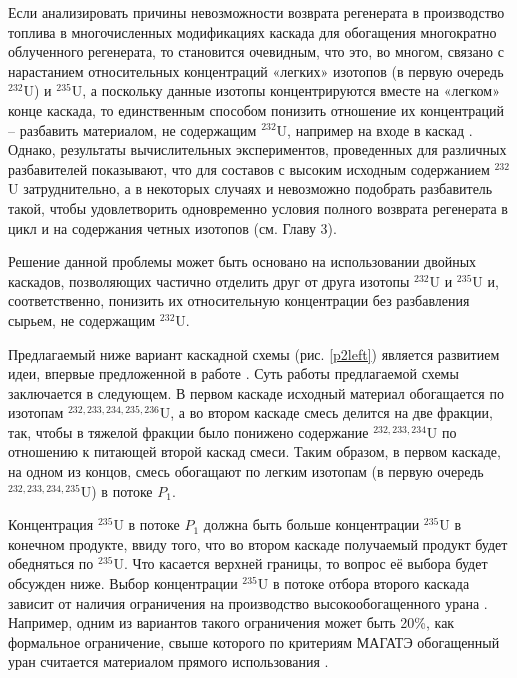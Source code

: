 Если анализировать причины невозможности возврата регенерата в производство топлива в многочисленных модификациях каскада для обогащения многократно облученного регенерата, то становится очевидным, что это, во многом, связано с нарастанием относительных концентраций «легких» изотопов (в первую очередь $^{232}$U) и $^{235}$U, а поскольку данные изотопы концентрируются вместе на «легком» конце каскада, то единственным способом понизить отношение их концентраций – разбавить материалом, не содержащим $^{232}$U, например на входе в каскад \cite{smirnovKaskadnyeShemyZadachah2012}. Однако, результаты вычислительных экспериментов, проведенных для различных разбавителей показывают, что для составов с высоким исходным содержанием $^{232}$U затруднительно, а в некоторых случаях и невозможно подобрать разбавитель такой, чтобы удовлетворить одновременно условия полного возврата регенерата в цикл и на содержания четных изотопов (см. Главу 3). 

Решение данной проблемы может быть основано на использовании двойных каскадов, позволяющих частично отделить друг от друга изотопы $^{232}$U и $^{235}$U и, соответственно, понизить их относительную концентрации без разбавления сырьем, не содержащим $^{232}$U. 

Предлагаемый ниже вариант каскадной схемы (рис. \ref{p2left}) является развитием идеи, впервые предложенной в работе \cite{vodolazskihSposobIzotopnogoVosstanovleniya2006}. Суть работы предлагаемой схемы заключается в следующем. В первом каскаде исходный материал обогащается по изотопам $^{232,233,234,235,236}$U, а во втором каскаде смесь делится на две фракции, так, чтобы в тяжелой фракции было понижено содержание $^{232,233,234}$U по отношению к питающей второй каскад смеси. Таким образом, в первом каскаде, на одном из концов, смесь обогащают по легким изотопам (в первую очередь $^{232,233,234,235}$U) в потоке $P_1$.

Концентрация $^{235}$U в потоке $P_1$ должна быть больше концентрации $^{235}$U в конечном продукте, ввиду того, что во втором каскаде получаемый продукт будет обедняться по $^{235}$U. Что касается верхней границы, то вопрос её выбора будет обсужден ниже.
Выбор концентрации $^{235}$U в потоке отбора второго каскада зависит от наличия ограничения на производство высокообогащенного урана \cite{brownOriginsSignificanceLimit2016}. Например, одним из вариантов такого ограничения может быть 20\%, как формальное ограничение, свыше которого по критериям МАГАТЭ обогащенный уран считается материалом прямого использования \cite{pshakinYadernoeNerasprostranenie2006}.

